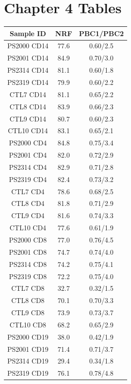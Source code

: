 \section{Chapter 4 Tables}

\begin{table}[htbp]
\centering
\begin{tabular}{@{} c c c}
\toprule
\textbf{Sample ID} & \textbf{NRF} & \textbf{PBC1/PBC2} \\
\midrule
\midrule
PS2000 CD14	& 77.6	& 0.60/2.5\\
PS2001 CD14	& 84.9	& 0.70/3.0\\
PS2314 CD14	& 81.1	& 0.60/1.8\\
PS2319 CD14	& 79.9	& 0.60/2.2\\
CTL7 CD14	  & 81.1	& 0.65/2.2\\
CTL8 CD14	  & 83.9	& 0.66/2.3\\
CTL9 CD14	  & 80.7	& 0.60/2.3\\
CTL10 CD14	& 83.1	& 0.65/2.1\\
\midrule
PS2000 CD4  & 84.8	& 0.75/3.4\\
PS2001 CD4	& 82.0	& 0.72/2.9\\
PS2314 CD4	& 82.9	& 0.71/2.8\\
PS2319 CD4	& 82.4	& 0.73/3.2\\
CTL7 CD4	  & 78.6	& 0.68/2.5\\
CTL8 CD4    & 81.8	& 0.71/2.9\\
CTL9 CD4    & 81.6	& 0.74/3.3\\
CTL10 CD4   & 77.6	& 0.61/1.9\\
\midrule
PS2000 CD8 & 77.0 &	0.76/4.5\\
PS2001 CD8 & 74.7 &	0.74/4.0\\
PS2314 CD8 & 74.2 &	0.75/4.1\\
PS2319 CD8 & 72.2 &	0.75/4.0\\
CTL7 CD8	 & 32.7 & 0.32/1.5\\
CTL8 CD8	 & 70.1 &	0.70/3.3\\
CTL9 CD8	 & 73.9 &	0.73/3.7\\
CTL10 CD8	 & 68.2 &	0.65/2.9\\
\midrule
PS2000 CD19	& 38.0 & 0.42/1.9\\
PS2001 CD19	& 71.4 & 0.71/3.7\\
PS2314 CD19	& 29.4 & 0.34/1.8\\
PS2319 CD19	& 76.1 & 0.78/4.8\\

\end{tabular}
\end{table}
